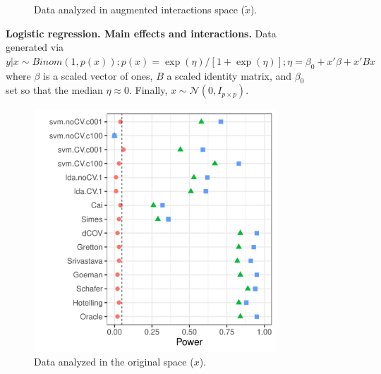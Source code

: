 \documentclass[]{bio}
\begin{document}
\begin{figure}[th]
\begin{subfigure}[t]{.45\columnwidth}
		\caption{Data analyzed in augmented interactions space ($\tilde x$).}
		\label{fig:interactions-in-augmented-space}
	\end{subfigure}
	\caption{\textbf{Logistic regression. Main effects and interactions.} 
		Data generated via $y|x \sim Binom(1,p(x));
		p(x)=\exp(\eta)/[1+\exp(\eta)];
		\eta=\beta_0 + x'\beta + x'Bx$ where 
		$\beta$ is a scaled vector of ones, 
		$B$ a scaled identity matrix, and $\beta_0$ set so that the median $\eta \approx0$.
		Finally, $x\sim \mathcal{N}(0,I_{p\times p})$. } 
	\label{fig:logistic-main-and-interactions}
\end{figure}





\begin{figure}[th]
	\centering
	\begin{subfigure}[t]{.45\columnwidth}
		\centering
		\includegraphics[width=1\columnwidth]{"art/file40"}
		\caption{Data analyzed in the original space ($x$).}
		\label{fig:main-only-original-space}
	\end{subfigure}
	\begin{subfigure}[t]{.45\columnwidth}
		\centering

\end{subfigure}
\end{figure}
\end{document}
